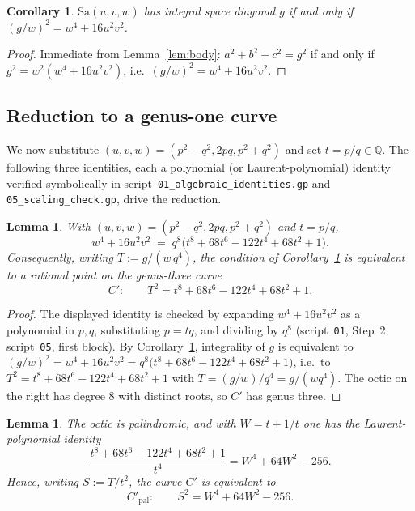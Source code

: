 \documentclass[11pt,reqno]{amsart}
\theoremstyle{plain}
\newtheorem{lemma}[theorem]{Lemma}
\newtheorem{corollary}[theorem]{Corollary}
\theoremstyle{definition}
\newcommand{\Q}{\mathbb{Q}}
\begin{document}
\begin{corollary}\label{cor:gw}
$\mathrm{Sa}(u,v,w)$ has integral space diagonal $g$ if and only if
$(g/w)^2=w^4+16u^2v^2$.
\end{corollary}

\begin{proof}
Immediate from Lemma~\ref{lem:body}: $a^2+b^2+c^2=g^2$ if and only if
$g^2=w^2(w^4+16u^2v^2)$, i.e.\ $(g/w)^2=w^4+16u^2v^2$.
\end{proof}

\subsection{Reduction to a genus-one curve}

We now substitute $(u,v,w)=(p^2-q^2,2pq,p^2+q^2)$ and set $t=p/q\in\Q$. The
following three identities, each a polynomial (or Laurent-polynomial) identity
verified symbolically in script~\texttt{01\_algebraic\_identities.gp} and
\texttt{05\_scaling\_check.gp}, drive the reduction.

\begin{lemma}\label{lem:octic}
With $(u,v,w)=(p^2-q^2,2pq,p^2+q^2)$ and $t=p/q$,
\[
w^4+16u^2v^2 \;=\; q^8\bigl(t^8+68t^6-122t^4+68t^2+1\bigr).
\]
Consequently, writing $T:=g/(w\,q^4)$, the condition of
Corollary~\ref{cor:gw} is equivalent to a rational point on the genus-three
curve
\[
C':\qquad T^2=t^8+68t^6-122t^4+68t^2+1 .
\]
\end{lemma}

\begin{proof}
The displayed identity is checked by expanding $w^4+16u^2v^2$ as a polynomial
in $p,q$, substituting $p=tq$, and dividing by $q^8$
(script~\texttt{01}, Step~2; script~\texttt{05}, first block). By
Corollary~\ref{cor:gw}, integrality of $g$ is equivalent to
$(g/w)^2=w^4+16u^2v^2=q^8\bigl(t^8+68t^6-122t^4+68t^2+1\bigr)$, i.e.\ to
$T^2=t^8+68t^6-122t^4+68t^2+1$ with $T=(g/w)/q^4=g/(wq^4)$. The octic on the
right has degree $8$ with distinct roots, so $C'$ has genus three.
\end{proof}

\begin{lemma}\label{lem:palindrome}
The octic is palindromic, and with $W=t+1/t$ one has the Laurent-polynomial
identity
\[
\frac{t^8+68t^6-122t^4+68t^2+1}{t^4}=W^4+64W^2-256 .
\]
Hence, writing $S:=T/t^2$, the curve $C'$ is equivalent to
\[
C'_{\mathrm{pal}}:\qquad S^2=W^4+64W^2-256 .
\]
\end{lemma}
\end{document}
